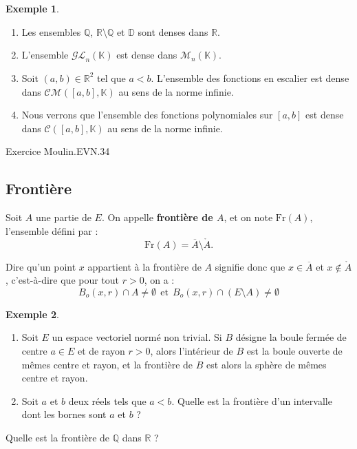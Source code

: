 \documentclass[french]{article}
\newcommand{\Q}{\mathbb{Q}}
\newcommand{\R}{\mathbb{R}}
\newcommand{\K}{\mathbb{K}}
\theoremstyle{plain}
\theoremstyle{definition}
\newtheorem*{ex}{Exemple}
\theoremstyle{remark}
\begin{document}
\begin{ex}
	\begin{enumerate}
		\item Les ensembles $\Q$, $\R\setminus\Q$ et $\mathbb{D}$ sont denses dans $\R$.
		\item L'ensemble $\mathcal{GL}_n(\K)$ est dense dans $\mathcal{M}_n(\K)$.
		\item Soit $(a,b)\in\R^2$ tel que $a<b$. L'ensemble des fonctions en escalier est dense dans $\mathcal{CM}([a,b],\K)$ au sens de la norme infinie.
		\item Nous verrons que l'ensemble des fonctions polynomiales sur $[a,b]$ est dense dans $\mathcal{C}([a,b],\K)$ au sens de la norme infinie.
	\end{enumerate}
\end{ex}

Exercice Moulin.EVN.34

\subsection{Frontière}

\begin{dfn}
	Soit $A$ une partie de $E$. On appelle \textbf{frontière de $A$}, et on note $\text{Fr}(A)$, l'ensemble défini par : $$\text{Fr}(A)=\overline{A}\setminus\mathring{A}.$$
\end{dfn}

Dire qu'un point $x$ appartient à la frontière de $A$ signifie donc que $x\in\overline{A}$ et $x\notin\mathring{A}$, c'est-à-dire que pour tout $r>0$, on a : 
$$B_o(x,r)\cap A\ne\emptyset\ \ \text{et}\ \ B_o(x,r)\cap(E\setminus A)\ne\emptyset$$

\begin{ex}
	\begin{enumerate}
		\item Soit $E$ un espace vectoriel normé non trivial. Si $B$ désigne la boule fermée de centre $a\in E$ et de rayon $r>0$, alors l'intérieur de $B$ est la boule ouverte de mêmes centre et rayon, et la frontière de $B$ est alors la sphère de mêmes centre et rayon.
		\item Soit $a$ et $b$ deux réels tels que $a<b$. Quelle est la frontière d'un intervalle dont les bornes sont $a$ et $b$ ?
	\end{enumerate}
\end{ex}

\begin{exo}
	Quelle est la frontière de $\Q$ dans $\R$ ?
\end{exo}
\end{document}
